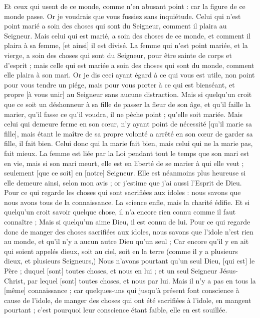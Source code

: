 \begin{multicols}{2}
Et ceux qui usent de ce monde, comme n'en abusant point : car la figure de ce monde passe.
Or je voudrais que vous fussiez sans inquiétude. Celui qui n'est point marié a soin des choses qui sont du Seigneur, comment il plaira au Seigneur.
Mais celui qui est marié, a soin des choses de ce monde, et comment il plaira à sa femme, [et ainsi] il est divisé.
La femme qui n'est point mariée, et la vierge, a soin des choses qui sont du Seigneur, pour être sainte de corps et d'esprit ; mais celle qui est mariée a soin des choses qui sont du monde, comment elle plaira à son mari.
Or je dis ceci ayant égard à ce qui vous est utile, non point pour vous tendre un piége, mais pour vous porter à ce qui est bienséant, et propre [à vous unir] au Seigneur sans aucune distraction.
Mais si quelqu'un croit que ce soit un déshonneur à sa fille de passer la fleur de son âge, et qu'il faille la marier, qu'il fasse ce qu'il voudra, il ne pèche point ; qu'elle soit mariée.
Mais celui qui demeure ferme en son cœur, n'y ayant point de nécessité [qu'il marie sa fille], mais étant le maître de sa propre volonté a arrêté en son cœur de garder sa fille, il fait bien.
Celui donc qui la marie fait bien, mais celui qui ne la marie pas, fait mieux.
La femme est liée par la Loi pendant tout le temps que son mari est en vie, mais si son mari meurt, elle est en liberté de se marier à qui elle veut ; seulement [que ce soit] en [notre] Seigneur.
Elle est néanmoins plus heureuse si elle demeure ainsi, selon mon avis ; or j'estime que j'ai aussi l'Esprit de Dieu.
\VerseOne{}Pour ce qui regarde les choses qui sont sacrifiées aux idoles : nous savons que nous avons tous de la connaissance. La science enfle, mais la charité édifie.
Et si quelqu'un croit savoir quelque chose, il n'a encore rien connu comme il faut connaître ;
Mais si quelqu'un aime Dieu, il est connu de lui.
Pour ce qui regarde donc de manger des choses sacrifiées aux idoles, nous savons que l'idole n'est rien au monde, et qu'il n'y a aucun autre Dieu qu'un seul ;
Car encore qu'il y en ait qui soient appelés dieux, soit au ciel, soit en la terre (comme il y a plusieurs dieux, et plusieurs Seigneurs,)
Nous n'avons pourtant qu'un seul Dieu, [qui est] le Père ; duquel [sont] toutes choses, et nous en lui ; et un seul Seigneur Jésus-Christ, par lequel [sont] toutes choses, et nous par lui.
Mais il n'y a pas en tous la [même] connaissance ; car quelques-uns qui jusqu'à présent font conscience à cause de l'idole, de manger des choses qui ont été sacrifiées à l'idole, en mangent pourtant ; c'est pourquoi leur conscience étant faible, elle en est souillée.

\end{multicols}
